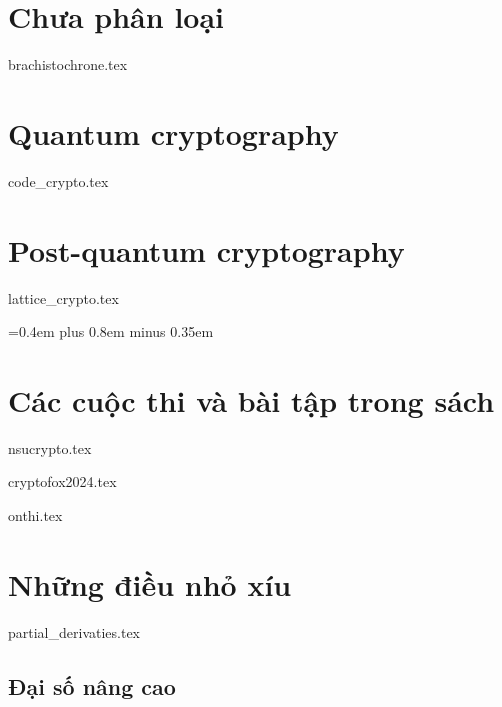 \documentclass{mynotes}
\begin{document}
\part{Chưa phân loại}





{brachistochrone.tex}



\part{Quantum cryptography}

\parttoc



{code_crypto.tex}

\part{Post-quantum cryptography}

\parttoc

{lattice_crypto.tex}

{
 \spaceskip=0.4em plus 0.8em minus 0.35em
\printbibliography[env=gostbibliography,heading=bibintoc,title={Tài liệu tham khảo}]
}


\part{Các cuộc thi và bài tập trong sách}

\parttoc

{nsucrypto.tex}

{cryptofox2024.tex}

{onthi.tex}

\part{Những điều nhỏ xíu}

\parttoc

{partial_derivaties.tex}

\chapter{Đại số nâng cao}
\end{document}
